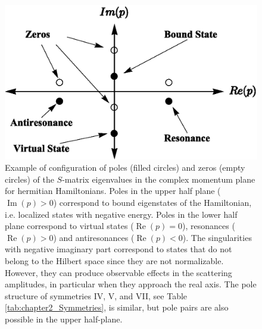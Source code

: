 \begin{figure}[h]
	\includegraphics[width=0.75\linewidth]{Figures/DiagramPoles.eps}
	\caption{Example of configuration of  poles (filled circles) and zeros (empty circles) of the $S$-matrix eigenvalues in the complex momentum plane for hermitian Hamiltonians.  Poles in the upper half plane ($\operatorname{Im}(p) > 0$) correspond to bound eigenstates of the Hamiltonian, i.e. localized states with negative energy. Poles in the lower half plane correspond to  virtual states ($\operatorname{Re}(p) = 0$), resonances ($\operatorname{Re}(p) > 0$) and antiresonances ($\operatorname{Re}(p)<0$). The singularities with negative imaginary part correspond to states that do not belong to the Hilbert space since they are not normalizable. However, they can produce observable effects in the scattering amplitudes, in particular when they approach the real axis. The pole structure of symmetries IV, V, and VII, see Table \ref{tab:chapter2_Symmetries},
	is similar, but pole pairs are also possible in the upper half-plane.}
	\label{fig:DiagramPoles}
\end{figure}





